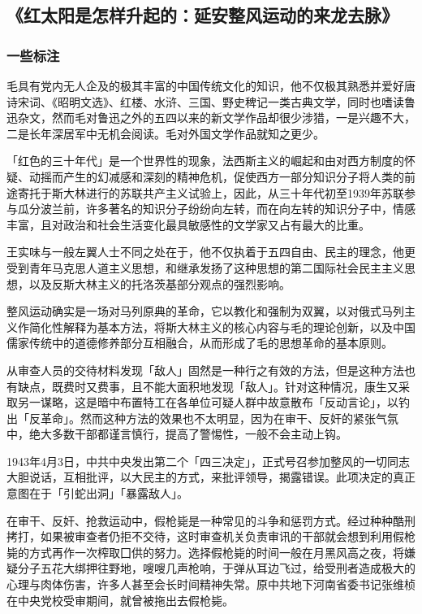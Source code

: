 \subsection{《红太阳是怎样升起的：延安整风运动的来龙去脉》}
\subsubsection{一些标注}
毛具有党内无人企及的极其丰富的中国传统文化的知识，他不仅极其熟悉并爱好唐诗宋词、《昭明文选》、红楼、水浒、三国、野史稗记一类古典文学，同时也嗜读鲁迅杂文，然而毛对鲁迅之外的五四以来的新文学作品却很少涉猎，一是兴趣不大，二是长年深居军中无机会阅读。毛对外国文学作品就知之更少。

「红色的三十年代」是一个世界性的现象，法西斯主义的崛起和由对西方制度的怀疑、动摇而产生的幻减感和深刻的精神危机，促使西方一部分知识分子将人类的前途寄托于斯大林进行的苏联共产主义试验上，因此，从三十年代初至1939年苏联参与瓜分波兰前，许多著名的知识分子纷纷向左转，而在向左转的知识分子中，情感丰富，且对政治和社会生活变化最具敏感性的文学家又占有最大的比重。

王实味与一般左翼人士不同之处在于，他不仅执着于五四自由、民主的理念，他更受到青年马克思人道主义思想，和继承发扬了这种思想的第二国际社会民主主义思想，以及反斯大林主义的托洛茨基部分观点的强烈影响。

整风运动确实是一场对马列原典的革命，它以教化和强制为双翼，以对俄式马列主义作简化性解释为基本方法，将斯大林主义的核心内容与毛的理论创新，以及中国儒家传统中的道德修养部分互相融合，从而形成了毛的思想革命的基本原则。

从审查人员的交待材料发现「敌人」固然是一种行之有效的方法，但是这种方法也有缺点，既费时又费事，且不能大面积地发现「敌人」。针对这种情况，康生又采取另一谋略，这是暗中布置特工在各单位可疑人群中故意散布「反动言论」，以钓出「反革命」。然而这种方法的效果也不太明显，因为在审干、反奸的紧张气氛中，绝大多数干部都谨言慎行，提高了警惕性，一般不会主动上钩。 

1943年4月3日，中共中央发出第二个「四三决定」，正式号召参加整风的一切同志大胆说话，互相批评，以大民主的方式，来批评领导，揭露错误。此项决定的真正意图在于「引蛇出洞」「暴露敌人」。

在审干、反奸、抢救运动中，假枪毙是一种常见的斗争和惩罚方式。经过种种酷刑拷打，如果被审查者仍拒不交待，这时审查机关负责审讯的干部就会想到利用假枪毙的方式再作一次榨取囗供的努力。选择假枪毙的时间一般在月黑风高之夜，将嫌疑分子五花大绑押往野地，嗖嗖几声枪响，于弹从耳边飞过，给受刑者造成极大的心理与肉体伤害，许多人甚至会长时间精神失常。原中共地下河南省委书记张维桢在中央党校受审期间，就曾被拖出去假枪毙。


